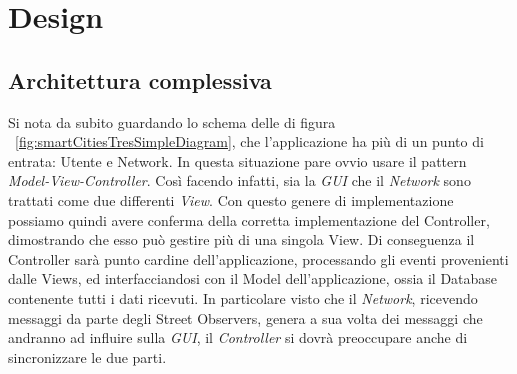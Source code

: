 \documentclass[a4paper,12pt]{report}
\begin{document}
\chapter{Design}

\section{Architettura complessiva}

Si nota da subito guardando lo schema delle di figura 
~\ref{fig:smartCitiesTresSimpleDiagram}, che l'applicazione 
ha più di un punto di entrata: Utente e Network. In questa situazione pare 
ovvio usare il pattern \textit{Model-View-Controller}. Così facendo infatti, 
sia la \textit{GUI} che il \textit{Network} sono trattati come due differenti 
\textit{View}. Con questo genere di implementazione possiamo quindi avere 
conferma della corretta implementazione del Controller, dimostrando che esso 
può gestire più di una singola View.\newline
Di conseguenza il Controller sarà punto cardine dell'applicazione, processando 
gli eventi provenienti dalle Views, ed interfacciandosi con il Model 
dell'applicazione, ossia il Database contenente tutti i dati ricevuti. 
In particolare visto che il \textit{Network}, ricevendo messaggi da parte degli 
Street Observers, genera a sua volta dei messaggi che andranno ad influire 
sulla \textit{GUI}, il \textit{Controller} si dovrà preoccupare anche di 
sincronizzare le due parti.
\newpage
\end{document}

